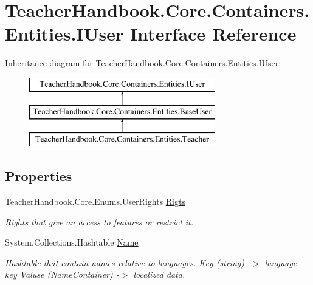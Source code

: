 \hypertarget{interface_teacher_handbook_1_1_core_1_1_containers_1_1_entities_1_1_i_user}{}\section{Teacher\+Handbook.\+Core.\+Containers.\+Entities.\+I\+User Interface Reference}
\label{interface_teacher_handbook_1_1_core_1_1_containers_1_1_entities_1_1_i_user}
Inheritance diagram for Teacher\+Handbook.\+Core.\+Containers.\+Entities.\+I\+User\+:\begin{figure}[H]
\begin{center}
\leavevmode
\includegraphics[height=3.000000cm]{d1/dfc/interface_teacher_handbook_1_1_core_1_1_containers_1_1_entities_1_1_i_user}
\end{center}
\end{figure}
\subsection*{Properties}
\begin{DoxyCompactItemize}
\item 
Teacher\+Handbook.\+Core.\+Enums.\+User\+Rights \mbox{\hyperlink{interface_teacher_handbook_1_1_core_1_1_containers_1_1_entities_1_1_i_user_a147a0793a5587c93da634d0c997e13ec}{Rigts}}
\begin{DoxyCompactList}\small\item\em Rights that give an access to features or restrict it. \end{DoxyCompactList}\item 
System.\+Collections.\+Hashtable \mbox{\hyperlink{interface_teacher_handbook_1_1_core_1_1_containers_1_1_entities_1_1_i_user_a528fbfbe0effa7e8683cb892b08c4c64}{Name}}
\begin{DoxyCompactList}\small\item\em Hashtable that contain names relative to languages. Key (string) -\/$>$ language key Valuse (Name\+Container) -\/$>$ localized data. \end{DoxyCompactList}\end{DoxyCompactItemize}


